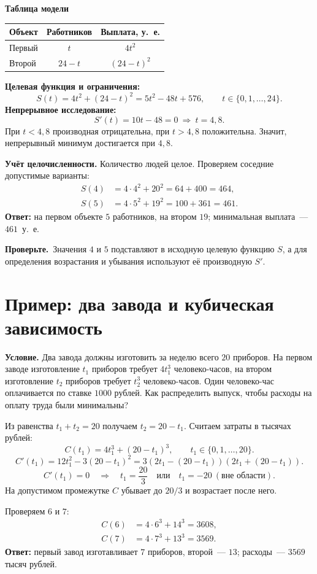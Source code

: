 \documentclass[a4paper,12pt]{article}
\newcommand{\caution}[1]{\par\noindent\textcolor{darkaccent}{\textbf{Проверьте.}}~#1\par}
\begin{document}
\textbf{Таблица модели}
\begin{center}
\begin{tabular}{@{}lcc@{}}
\toprule
Объект & Работников & Выплата, у.~е.\\
\midrule
Первый & $t$ & $4t^2$\\
Второй & $24-t$ & $(24-t)^2$\\
\bottomrule
\end{tabular}
\end{center}

\textbf{Целевая функция и ограничения:}
\[
S(t)=4t^2+(24-t)^2=5t^2-48t+576,
\qquad t\in\{0,1,\ldots,24\}.
\]
\textbf{Непрерывное исследование:}
\[
S'(t)=10t-48=0\ \Rightarrow\ t=4{,}8.
\]
При $t<4{,}8$ производная отрицательна, при $t>4{,}8$ положительна. Значит, непрерывный минимум достигается при $4{,}8$.

\textbf{Учёт целочисленности.} Количество людей целое. Проверяем соседние допустимые варианты:
\begin{align*}
S(4)&=4\cdot4^2+20^2=64+400=464,\\
S(5)&=4\cdot5^2+19^2=100+361=461.
\end{align*}
\textcolor{darkaccent}{\textbf{Ответ:}} на первом объекте $5$ работников, на втором $19$; минимальная выплата~--- $461$~у.~е.

\caution{Значения $4$ и $5$ подставляют в исходную целевую функцию $S$, а для определения возрастания и убывания используют её производную $S'$.}

\section{Пример: два завода и кубическая зависимость}
\textbf{Условие.} Два завода должны изготовить за неделю всего $20$ приборов. На первом заводе изготовление $t_1$ приборов требует $4t_1^3$ человеко-часов, на втором изготовление $t_2$ приборов требует $t_2^3$ человеко-часов. Один человеко-час оплачивается по ставке $1000$ рублей. Как распределить выпуск, чтобы расходы на оплату труда были минимальны?

Из равенства $t_1+t_2=20$ получаем $t_2=20-t_1$. Считаем затраты в тысячах рублей:
\[
C(t_1)=4t_1^3+(20-t_1)^3,\qquad t_1\in\{0,1,\ldots,20\}.
\]
\[
C'(t_1)=12t_1^2-3(20-t_1)^2
=3(2t_1-(20-t_1))(2t_1+(20-t_1)).
\]
\[
C'(t_1)=0\quad\Rightarrow\quad t_1=\frac{20}{3}
\quad\text{или}\quad t_1=-20\ (\text{вне области}).
\]
На допустимом промежутке $C$ убывает до $20/3$ и возрастает после него.\par\pagebreak[4]\noindent Проверяем $6$ и $7$:
\begin{align*}
C(6)&=4\cdot6^3+14^3=3608,\\
C(7)&=4\cdot7^3+13^3=3569.
\end{align*}
\textcolor{darkaccent}{\textbf{Ответ:}} первый завод изготавливает $7$ приборов, второй~--- $13$; расходы~--- $3569$ тысяч рублей.
\end{document}

